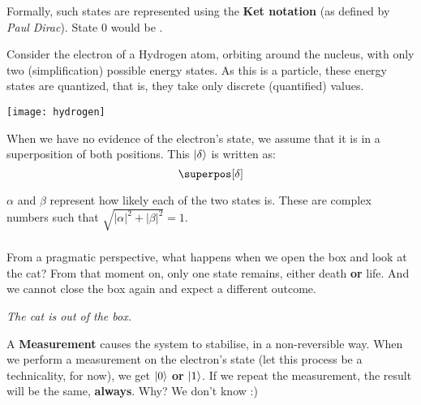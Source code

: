 \documentclass[aspectratio=43]{beamer}
\begin{document}
\begin{frame}{\qsp}
    \begin{cardTiny}
        Formally, such states are represented using the \textbf{Ket notation} (as defined by \textit{Paul Dirac}). State 0 would be .
    \end{cardTiny}
    \begin{cardTiny}
        \begin{multicols}{2}
    		Consider the electron of a Hydrogen atom, orbiting around the nucleus, with only two (simplification) possible energy states. As this is a \q particle, these energy states are quantized, that is, they take only discrete (quantified) values.
    		\begin{center}
    		\texttt{[image: hydrogen]}
    		\end{center}
	    \end{multicols}
    \end{cardTiny}
\pagenumber
\end{frame}

\begin{frame}{\qsp}
    \begin{card}
        When we have no evidence of the electron's state, we assume that it is in a superposition of both positions. This \qsp $\ket{\delta}$ is written as:
	\begin{equation*}
	    \superpos[\delta]
	\end{equation*}
    \end{card}
    \begin{cardTiny}
        $\alpha$ and $\beta$ represent how likely each of the two states is. These are complex numbers such that $\sqrt{|\alpha|^2 + |\beta|^2} = 1$.
    \end{cardTiny}
\pagenumber
\end{frame}


\subsubsection{\qmt}
\begin{frame}{\qmt}
    \begin{cardTiny}
        From a pragmatic perspective, what happens when we open the box and look at the cat? From that moment on, only one state remains, either death \textbf{or} life. And we cannot close the box again and expect a different outcome.
    \end{cardTiny}
    \begin{cardTiny}
        \centering\textit{The cat is out of the box.}
    \end{cardTiny}
    \begin{cardTiny}
        A \textbf{Measurement} causes the system to stabilise, in a non-reversible way. When we perform a measurement  on the electron's state (let this process be a technicality, for now), we get $\ket{0}$ \textbf{or} $\ket{1}$. If we repeat the measurement, the result will be the same, \textbf{always}. Why? We don't know :)
    \end{cardTiny}
\pagenumber
\end{frame}
\end{document}
